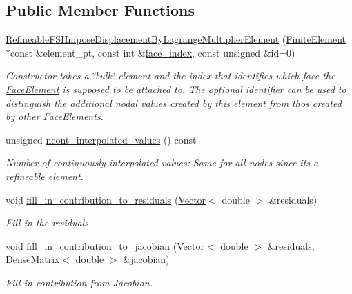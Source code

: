 \subsection*{Public Member Functions}
\begin{DoxyCompactItemize}
\item 
\hyperlink{classoomph_1_1RefineableFSIImposeDisplacementByLagrangeMultiplierElement_a96dc26cea0c337b94b09a2626b3eade2}{Refineable\+F\+S\+I\+Impose\+Displacement\+By\+Lagrange\+Multiplier\+Element} (\hyperlink{classoomph_1_1FiniteElement}{Finite\+Element} $\ast$const \&element\+\_\+pt, const int \&\hyperlink{classoomph_1_1FaceElement_a478d577ac6db67ecc80f1f02ae3ab170}{face\+\_\+index}, const unsigned \&id=0)
\begin{DoxyCompactList}\small\item\em Constructor takes a \char`\"{}bulk\char`\"{} element and the index that identifies which face the \hyperlink{classoomph_1_1FaceElement}{Face\+Element} is supposed to be attached to. The optional identifier can be used to distinguish the additional nodal values created by this element from thos created by other Face\+Elements. \end{DoxyCompactList}\item 
unsigned \hyperlink{classoomph_1_1RefineableFSIImposeDisplacementByLagrangeMultiplierElement_af0e6193a9a1744d19efd4dfb48234bb0}{ncont\+\_\+interpolated\+\_\+values} () const
\begin{DoxyCompactList}\small\item\em Number of continuously interpolated values\+: Same for all nodes since it\textquotesingle{}s a refineable element. \end{DoxyCompactList}\item 
void \hyperlink{classoomph_1_1RefineableFSIImposeDisplacementByLagrangeMultiplierElement_aa4b78afa54ddb638bfc9428b2b6fe860}{fill\+\_\+in\+\_\+contribution\+\_\+to\+\_\+residuals} (\hyperlink{classoomph_1_1Vector}{Vector}$<$ double $>$ \&residuals)
\begin{DoxyCompactList}\small\item\em Fill in the residuals. \end{DoxyCompactList}\item 
void \hyperlink{classoomph_1_1RefineableFSIImposeDisplacementByLagrangeMultiplierElement_a3c86bf6884cd7cfdfa8e7381fbd16fcf}{fill\+\_\+in\+\_\+contribution\+\_\+to\+\_\+jacobian} (\hyperlink{classoomph_1_1Vector}{Vector}$<$ double $>$ \&residuals, \hyperlink{classoomph_1_1DenseMatrix}{Dense\+Matrix}$<$ double $>$ \&jacobian)
\begin{DoxyCompactList}\small\item\em Fill in contribution from Jacobian. \end{DoxyCompactList}\end{DoxyCompactItemize}
